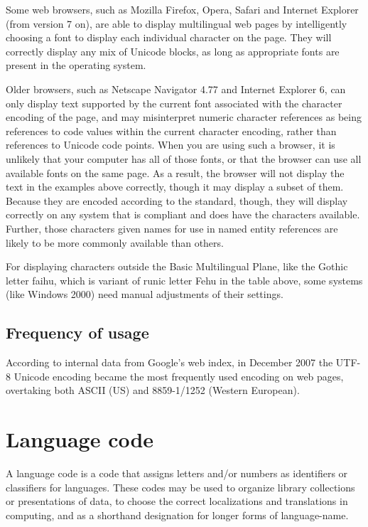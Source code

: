 
Some web browsers, such as Mozilla Firefox, Opera, Safari and Internet Explorer (from version 7 on), are able to display multilingual web pages by intelligently choosing a font to display each individual character on the page. They will correctly display any mix of Unicode blocks, as long as appropriate fonts are present in the operating system.

Older browsers, such as Netscape Navigator 4.77 and Internet Explorer 6, can only display text supported by the current font associated with the character encoding of the page, and may misinterpret numeric character references as being references to code values within the current character encoding, rather than references to Unicode code points. When you are using such a browser, it is unlikely that your computer has all of those fonts, or that the browser can use all available fonts on the same page. As a result, the browser will not display the text in the examples above correctly, though it may display a subset of them. Because they are encoded according to the standard, though, they will display correctly on any system that is compliant and does have the characters available. Further, those characters given names for use in named entity references are likely to be more commonly available than others.

For displaying characters outside the Basic Multilingual Plane, like the Gothic letter faihu, which is variant of runic letter Fehu in the table above, some systems (like Windows 2000) need manual adjustments of their settings.



\section{Frequency of usage}


According to internal data from Google's web index, in December 2007 the UTF-8 Unicode encoding became the most frequently used encoding on web pages, overtaking both ASCII (US) and 8859-1/1252 (Western European).





\chapter{Language code}

A language code\cite{language_code} is a code that assigns letters and/or numbers as identifiers or classifiers for languages. These codes may be used to organize library collections or presentations of data, to choose the correct localizations and translations in computing, and as a shorthand designation for longer forms of language-name.








